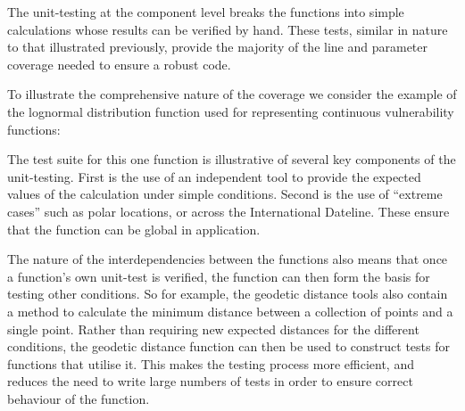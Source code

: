 The unit-testing at the component level breaks the functions into simple calculations whose results can be verified by hand. These tests, similar in nature to that illustrated previously, provide the majority of the line and parameter coverage needed to ensure a robust code.

To illustrate the comprehensive nature of the coverage we consider the example of the lognormal distribution function used for representing continuous vulnerability functions:



The test suite for this one function is illustrative of several key components of the unit-testing. First is the use of an independent tool to provide the expected values of the calculation under simple conditions. Second is the use of ``extreme cases'' such as polar locations, or across the International Dateline. These ensure that the function can be global in application.

The nature of the interdependencies between the functions also means that once a function's own unit-test is verified, the function can then form the basis for testing other conditions. So for example, the geodetic distance tools also contain a method to calculate the minimum distance between a collection of points and a single point. Rather than requiring new expected distances for the different conditions, the geodetic distance function can then be used to construct tests for functions that utilise it. This makes the testing process more efficient, and reduces the need to write large numbers of tests in order to ensure correct behaviour of the function.